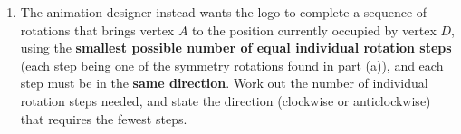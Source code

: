 \begin{question}
\begin{enumerate}
    \vspace{2cm}

    \item[(c)] The animation designer instead wants the logo to complete a sequence of rotations that brings vertex $A$ to the position currently occupied by vertex $D$, using the \textbf{smallest possible number of equal individual rotation steps} (each step being one of the symmetry rotations found in part (a)), and each step must be in the \textbf{same direction}. Work out the number of individual rotation steps needed, and state the direction (clockwise or anticlockwise) that requires the fewest steps.

    \vspace{3.5cm}
\end{enumerate}
\end{question}
